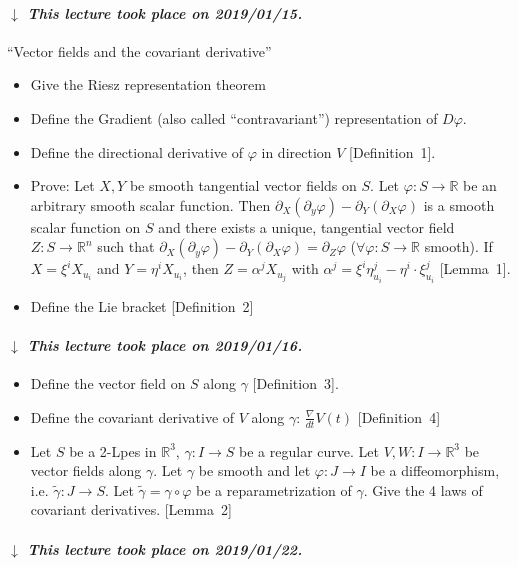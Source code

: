 \documentclass{article}
\numberwithin{lecref}{section}
\newcommand{\dateref}[1]{%
  \begin{mdframed}[backgroundcolor=gray!10,innerbottommargin=0pt,innertopmargin=0pt]
    \paragraph{\textit{$\downarrow$ This lecture took place on #1.}}%
  \end{mdframed}%
}
\begin{document}
\dateref{2019/01/15}

\enquote{Vector fields and the covariant derivative}

\begin{itemize}
  \item Give the Riesz representation theorem
  \item Define the Gradient (also called \enquote{contravariant}) representation of $D \varphi$.
  \item Define the directional derivative of $\varphi$ in direction $V$ [Definition~1].
  \item Prove: Let $X, Y$ be smooth tangential vector fields on $S$.
    Let $\varphi: S \to \mathbb R$ be an arbitrary smooth scalar function.
    Then $\partial_X (\partial_y \varphi) - \partial_Y (\partial_X \varphi)$ is a smooth scalar function on $S$ and
    there exists a unique, tangential vector field $Z: S \to \mathbb R^n$ such that $\partial_X (\partial_y \varphi) - \partial_Y (\partial_X \varphi) = \partial_Z \varphi$ ($\forall \varphi: S \to \mathbb R$ smooth). If $X = \xi^i X_{u_i}$ and $Y = \eta^i X_{u_i}$, then $Z = \alpha^j X_{u_j}$ with $\alpha^j = \xi^i \eta_{u_i}^j - \eta^i \cdot \xi^j_{u_i}$ [Lemma~1].
  \item Define the Lie bracket [Definition~2]
\end{itemize}

\dateref{2019/01/16}

\begin{itemize}
  \item Define the vector field on $S$ along $\gamma$ [Definition~3].
  \item Define the covariant derivative of $V$ along $\gamma$: $\frac{\nabla}{dt} V(t)$ [Definition~4]
  \item Let $S$ be a 2-Lpes in $\mathbb R^3$, $\gamma: I \to S$ be a regular curve. Let $V, W: I \to \mathbb R^3$ be vector fields along $\gamma$. Let $\gamma$ be smooth and let $\varphi: J \to I$ be a diffeomorphism, i.e. $\tilde\gamma: J \to S$. Let $\tilde\gamma = \gamma \circ \varphi$ be a reparametrization of $\gamma$. Give the 4 laws of covariant derivatives. [Lemma~2]
\end{itemize}

\dateref{2019/01/22}
\end{document}
